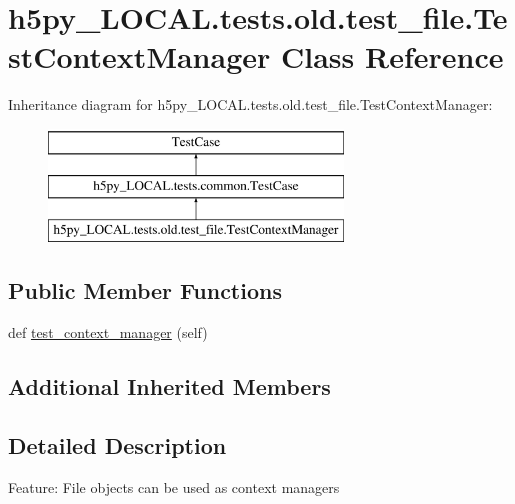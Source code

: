\hypertarget{classh5py__LOCAL_1_1tests_1_1old_1_1test__file_1_1TestContextManager}{}\section{h5py\+\_\+\+L\+O\+C\+A\+L.\+tests.\+old.\+test\+\_\+file.\+Test\+Context\+Manager Class Reference}
\label{classh5py__LOCAL_1_1tests_1_1old_1_1test__file_1_1TestContextManager}
Inheritance diagram for h5py\+\_\+\+L\+O\+C\+A\+L.\+tests.\+old.\+test\+\_\+file.\+Test\+Context\+Manager\+:\begin{figure}[H]
\begin{center}
\leavevmode
\includegraphics[height=3.000000cm]{classh5py__LOCAL_1_1tests_1_1old_1_1test__file_1_1TestContextManager}
\end{center}
\end{figure}
\subsection*{Public Member Functions}
\begin{DoxyCompactItemize}
\item 
def \hyperlink{classh5py__LOCAL_1_1tests_1_1old_1_1test__file_1_1TestContextManager_a76d454a08ccd00d02787aa6710acb673}{test\+\_\+context\+\_\+manager} (self)
\end{DoxyCompactItemize}
\subsection*{Additional Inherited Members}


\subsection{Detailed Description}
\begin{DoxyVerb}    Feature: File objects can be used as context managers
\end{DoxyVerb}
 

